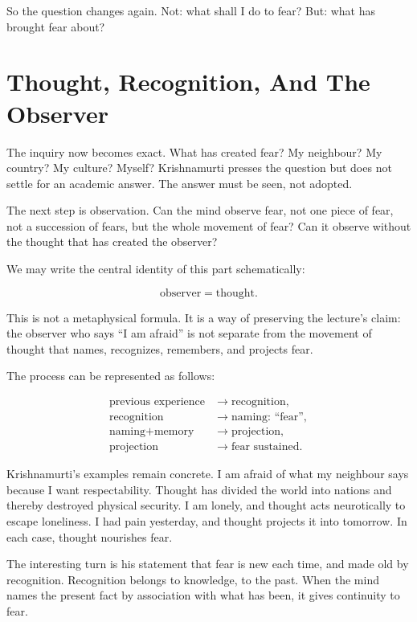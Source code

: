 So the question changes again. Not: what shall I do to fear? But: what has brought fear about?

\section{Thought, Recognition, And The Observer}

The inquiry now becomes exact. What has created fear? My neighbour? My country? My culture? Myself? Krishnamurti presses the question but does not settle for an academic answer. The answer must be seen, not adopted.

The next step is observation. Can the mind observe fear, not one piece of fear, not a succession of fears, but the whole movement of fear? Can it observe without the thought that has created the observer?

We may write the central identity of this part schematically:

\begin{equation}
\text{observer} = \text{thought}.
\end{equation}

This is not a metaphysical formula. It is a way of preserving the lecture's claim: the observer who says ``I am afraid'' is not separate from the movement of thought that names, recognizes, remembers, and projects fear.

The process can be represented as follows:

\begin{align}
\text{previous experience} &\longrightarrow \text{recognition}, \\
\text{recognition} &\longrightarrow \text{naming: ``fear''}, \\
\text{naming} + \text{memory} &\longrightarrow \text{projection}, \\
\text{projection} &\longrightarrow \text{fear sustained}.
\end{align}

Krishnamurti's examples remain concrete. I am afraid of what my neighbour says because I want respectability. Thought has divided the world into nations and thereby destroyed physical security. I am lonely, and thought acts neurotically to escape loneliness. I had pain yesterday, and thought projects it into tomorrow. In each case, thought nourishes fear.

The interesting turn is his statement that fear is new each time, and made old by recognition. Recognition belongs to knowledge, to the past. When the mind names the present fact by association with what has been, it gives continuity to fear.

